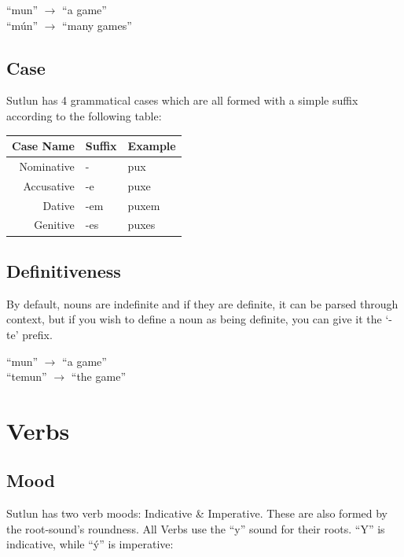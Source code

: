 \documentclass{book}
\begin{document}
\begin{center}
    ``mun'' $\rightarrow$ ``a game'' \\
    ``mún'' $\rightarrow$ ``many games''
\end{center}

\subsection{Case}
Sutlun has 4 grammatical cases which are all formed with a simple suffix according to the following table:

\begin{center}
    \begin{tabular}{|r|l|l|}
        \hline
        Case Name   & Suffix    & Example \\
        \hline
        Nominative  & -         & pux \\
        Accusative  & -e        & puxe \\
        Dative      & -em       & puxem \\
        Genitive    & -es       & puxes \\
        \hline
    \end{tabular}
\end{center}

\subsection{Definitiveness}
By default, nouns are indefinite and if they are definite, it can be parsed through context,
but if you wish to define a noun as being definite, you can give it the `-te' prefix.

\begin{center}
    ``mun'' $\rightarrow$ ``a game'' \\
    ``temun'' $\rightarrow$ ``the game''
\end{center}


\section{Verbs}
\subsection{Mood}
Sutlun has two verb moods: Indicative \& Imperative. These are also formed by the root-sound's roundness.
All Verbs use the ``y'' sound for their roots. ``Y'' is indicative, while ``ý'' is imperative:
\end{document}
